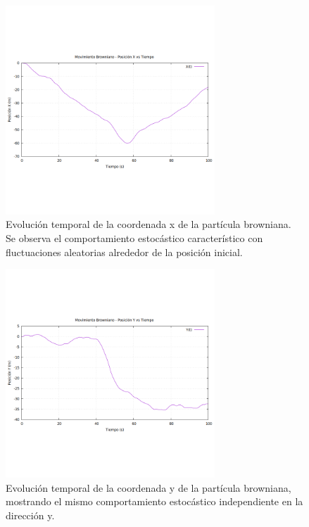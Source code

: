 \documentclass[11pt,a4paper]{article}
\begin{document}
\begin{figure}[h!]
    \centering
    \includegraphics[width=0.7\textwidth]{../results/browniano_sim_plot_x_vs_t.png}
    \caption{Evolución temporal de la coordenada x de la partícula browniana. Se observa el comportamiento estocástico característico con fluctuaciones aleatorias alrededor de la posición inicial.}
    \label{fig:x_vs_t}
\end{figure}

\begin{figure}[h!]
    \centering
    \includegraphics[width=0.7\textwidth]{../results/browniano_sim_plot_y_vs_t.png}
    \caption{Evolución temporal de la coordenada y de la partícula browniana, mostrando el mismo comportamiento estocástico independiente en la dirección y.}
    \label{fig:y_vs_t}
\end{figure}
\end{document}
